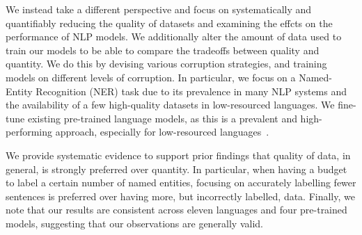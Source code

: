We instead take a different perspective and focus on systematically and quantifiably reducing the quality of datasets and examining the effcts on the performance of NLP models. We additionally alter the amount of data used to train our models to be able to compare the tradeoffs between quality and quantity. We do this by devising various corruption strategies, and training models on different levels of corruption.
In particular, we focus on a Named-Entity Recognition (NER) task due to its prevalence in many NLP systems and the availability of a few high-quality datasets in low-resourced languages. We fine-tune existing pre-trained language models, as this is a prevalent and high-performing approach, especially for low-resourced languages~\citep{ogueji2021Small,adelani2021MasakhaNER,alabi2022Multilingual}. 

We provide systematic evidence to support prior findings that quality of data, in general, is strongly preferred over quantity. In particular, when having a budget to label a certain number of named entities, focusing on accurately labelling fewer sentences is preferred over having more, but incorrectly labelled, data. Finally, we note that our results are consistent across eleven languages and four pre-trained models, suggesting that our observations are generally valid.
